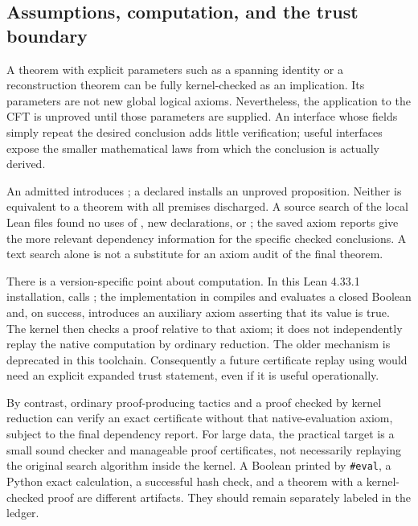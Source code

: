 \subsection{Assumptions, computation, and the trust boundary}

A theorem with explicit parameters such as a spanning identity or a
reconstruction theorem can be fully kernel-checked as an implication.
Its parameters are not new global logical axioms. Nevertheless, the
application to the CFT is unproved until those parameters are supplied.
An interface whose fields simply repeat the desired conclusion adds
little verification; useful interfaces expose the smaller mathematical
laws from which the conclusion is actually derived.

An admitted  introduces ; a declared
 installs an unproved proposition. Neither is equivalent
to a theorem with all premises discharged. A source search of the local
 Lean files found no uses of ,
new  declarations, or ; the saved
axiom reports give the more relevant dependency information for the
specific checked conclusions. A text search alone is not a substitute
for an axiom audit of the final theorem.

There is a version-specific point about computation. In this Lean
4.33.1 installation,  calls
; the implementation in
 compiles and evaluates a closed Boolean
and, on success, introduces an auxiliary axiom asserting that its value
is true. The kernel then checks a proof relative to that axiom; it does
not independently replay the native computation by ordinary reduction.
The older  mechanism is deprecated in this
toolchain. Consequently a future certificate replay using
 would need an explicit expanded trust statement,
even if it is useful operationally.

By contrast, ordinary proof-producing tactics and a 
proof checked by kernel reduction can verify an exact certificate
without that native-evaluation axiom, subject to the final dependency
report. For large data, the practical target is a small sound checker
and manageable proof certificates, not necessarily replaying the
original search algorithm inside the kernel. A Boolean printed by
\texttt{\#eval}, a Python exact calculation, a successful hash check,
and a theorem with a kernel-checked proof are different artifacts.
They should remain separately labeled in the ledger.

